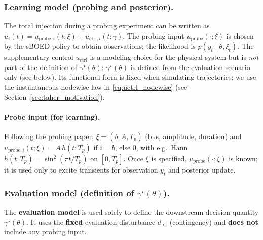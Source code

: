 \documentclass[10pt]{article}
\begin{document}
\subsubsection*{Learning model (probing and posterior).}
The total injection during a probing experiment can be written as $u_i(t)=u_{\mathrm{probe},i}(t;\xi)+u_{\mathrm{ctrl},i}(t;\gamma)$. The probing input $u_{\mathrm{probe}}(\cdot;\xi)$ is chosen by the sBOED policy to obtain observations; the likelihood is $p(y_t\mid\theta,\xi_t)$. The supplementary control $u_{\mathrm{ctrl}}$ is a modeling choice for the physical system but is \emph{not} part of the definition of $\gamma^\star(\theta)$: $\gamma^\star(\theta)$ is defined from the evaluation scenario only (see below). Its functional form is fixed when simulating trajectories; we use the instantaneous nodewise law in \eqref{eq:uctrl_nodewise} (see Section~\ref{sec:taher_motivation}).

\paragraph{Probe input (for learning).}
Following the probing paper, $\xi=(b,A,T_p)$ (bus, amplitude, duration) and
$u_{\mathrm{probe},i}(t;\xi)=A\,h(t;T_p)$ if $i=b$, else $0$, with e.g.\ Hann $h(t;T_p)=\sin^2(\pi t/T_p)$ on $[0,T_p]$. Once $\xi$ is specified, $u_{\mathrm{probe}}(\cdot;\xi)$ is known; it is used only to excite transients for observation $y_t$ and posterior update.

\subsubsection*{Evaluation model (definition of $\gamma^\star(\theta)$).}
The \textbf{evaluation model} is used solely to define the downstream decision quantity $\gamma^\star(\theta)$. It uses the \textbf{fixed} evaluation disturbance $d_{\mathrm{ref}}$ (contingency) and \textbf{does not} include any probing input.
\end{document}
